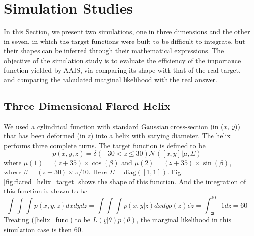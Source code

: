 \section{Simulation Studies} \label{sec:simulation}

In this Section, we present two simulations, one in three dimensions
and the other in seven, in which the target functions were built to
be difficult to integrate, but their shapes can be inferred through
their mathematical expressions. The objective of the simulation
study is to evaluate the efficiency of the importance function
yielded by AAIS, via comparing its shape with that of the real
target, and comparing the calculated marginal likelihood with the
real answer.

\subsection{Three Dimensional Flared
Helix}\label{sec:example1}

We used a cylindrical function with standard Gaussian cross-section
(in ($x$, $y$)) that has been deformed (in $z$) into a helix with
varying diameter. The helix performs three complete turns. The
target function is defined to be
\begin{equation}\label{helix_func}
p(x,y,z)=\delta(-30<z\leq30)\mathcal{N}([x,y]|\mu,\Sigma)
\end{equation}
where $\mu(1)=(z+35)\times\cos(\beta)$ and
$\mu(2)=(z+35)\times\sin(\beta)$, where $\beta=(z+30)\times\pi/10$.
Here $\Sigma=\mbox{diag}([1,1])$. Fig.\ref{fig:flared_helix_target}
shows the shape of this function. And the integration of this
function is shown to be
\begin{equation}
\int\int\int p(x,y,z)dxdydz=\int\int\int p(x,y|z)dxdy
p(z)dz=\int_{-30}^{30} 1 dz=60
\end{equation}
Treating (\ref{helix_func}) to be $L(y|\theta)p(\theta)$, the
marginal likelihood in this simulation case is then 60.


